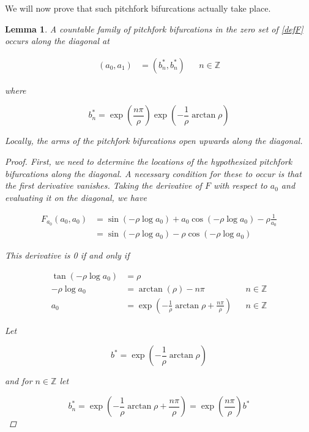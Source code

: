 \documentclass[12pt]{article}
\def\Z{{\mathbb Z}}
\newtheorem{lemma}{Lemma}
\begin{document}
We will now prove that such pitchfork bifurcations actually take place.


\begin{lemma}
A countable family of pitchfork bifurcations in the zero set of \eqref{defF} occurs along the diagonal at 

\begin{align*}
(a_0, a_1) &= (b_n^*, b_n^*) && n \in \Z
\end{align*}

where 

\begin{equation}
b^*_n = \exp\left(\frac{n \pi}{\rho} \right) \exp \left( -\frac{1}{\rho} \arctan \rho \right)
\end{equation}

Locally, the arms of the pitchfork bifurcations open upwards along the diagonal.

\begin{proof}
First, we need to determine the locations of the hypothesized pitchfork bifurcations along the diagonal. A necessary condition for these to occur is that the first derivative vanishes. Taking the derivative of $F$ with respect to $a_0$ and evaluating it on the diagonal, we have

\begin{align*}
F_{a_0}(a_0, a_0) &= 
\sin \left( - \rho \log a_0 \right)
+ a_0 \cos \left( - \rho \log a_0 \right)- \rho \frac{1}{a_0} \\
&= \sin \left( - \rho \log a_0 \right) - \rho \cos \left( - \rho \log a_0 \right)
\end{align*}

This derivative is 0 if and only if

\begin{align*}
\tan \left( -\rho \log a_0 \right) &=  \rho \\
-\rho \log a_0 &= \arctan \left( \rho\right) - n \pi && n \in \Z \\ 
a_0 &= \exp \left( -\frac{1}{\rho} \arctan \rho + \frac{n \pi}{\rho} \right) && n \in \Z
\end{align*}

Let 

\begin{equation}
b^* = \exp \left( -\frac{1}{\rho} \arctan \rho \right)
\end{equation}

and for $n \in \Z$ let 

\begin{equation}
b^*_n = \exp \left( -\frac{1}{\rho} \arctan \rho + \frac{n \pi}{\rho} \right) 
= \exp\left(\frac{n \pi}{\rho} \right) b^*
\end{equation}


\end{proof}
\end{lemma}
\end{document}
